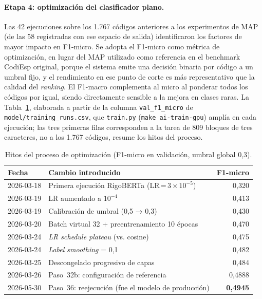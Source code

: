 \paragraph{Etapa 4: optimización del clasificador plano.}
Las 42 ejecuciones sobre los 1.767 códigos anteriores a los experimentos de MAP (de las 58 registradas con ese espacio de salida) identificaron los factores de mayor impacto en F1-micro. Se adopta el F1-micro como métrica de optimización, en lugar del MAP utilizado como referencia en el benchmark CodiEsp original, porque el sistema emite una decisión binaria por código a un umbral fijo, y el rendimiento en ese punto de corte es más representativo que la calidad del \emph{ranking}. El F1-macro complementa al micro al ponderar todos los códigos por igual, siendo directamente sensible a la mejora en clases raras. La Tabla~\ref{tab:hitos}, elaborada a partir de la columna \texttt{val\_f1\_micro} de \texttt{model/\allowbreak{}training\_runs.csv}, que \texttt{train.py} (\texttt{make ai-train-gpu}) amplía en cada ejecución; las tres primeras filas corresponden a la tarea de 809 bloques de tres caracteres, no a los 1.767 códigos, resume los hitos del proceso.

\begin{table}[h]
\centering
\caption{Hitos del proceso de optimización (F1-micro en validación, umbral global 0,3).}
\label{tab:hitos}
\begin{tabular}{llr}
\hline
\textbf{Fecha} & \textbf{Cambio introducido} & \textbf{F1-micro} \\
\hline
2026-03-18 & Primera ejecución RigoBERTa (LR\,=\,$3\times10^{-5}$) & 0,320 \\
2026-03-19 & LR aumentado a $10^{-4}$ & 0,413 \\
2026-03-19 & Calibración de umbral (0,5 → 0,3) & 0,430 \\
2026-03-20 & Batch virtual 32 + preentrenamiento 10 épocas & 0,470 \\
2026-03-24 & \emph{LR schedule plateau} (vs. cosine) & 0,475 \\
2026-03-24 & \emph{Label smoothing} = 0,1 & 0,482 \\
2026-03-25 & Descongelado progresivo de capas & 0,484 \\
2026-03-26 & Paso~32b: configuración de referencia & 0,4888 \\
2026-05-30 & Paso~36: reejecución (fue el modelo de producción) & \textbf{0,4945} \\
\hline
\end{tabular}
\end{table}


